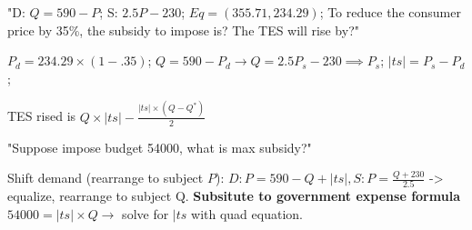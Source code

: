 \documentclass[a4paper]{article}
\begin{document}
\begin{multicols*}{3}
        "D: $Q=590-P$; S: $2.5P-230$; $Eq = (355.71,234.29)$; To reduce the consumer price by 35\%, the subsidy to impose is? The TES will rise by?"

    $P_d = 234.29 \times (1-.35)$; $Q=590-P_d \to Q= 2.5P_s-230 \implies P_s$; $|ts| = P_s - P_d$;

        TES rised is $Q\times |ts| - \frac{|ts| \times (Q-Q^*)}{2}$

        "Suppose impose budget 54000, what is max subsidy?"

        Shift demand (rearrange to subject $P$): $D: P=590-Q+|ts|, S: P=\frac{Q+230}{2.5}$ -> equalize, rearrange to subject Q. \textbf{Subsitute to government expense formula} $54000 = |ts| \times Q \to$ solve for $|ts$ with quad equation.

\end{multicols*}
\end{document}

